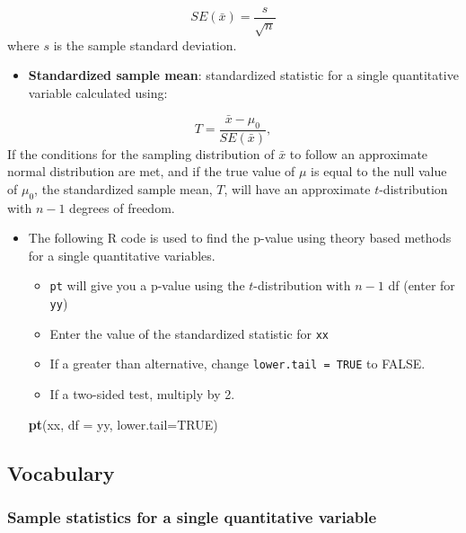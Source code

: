 \documentclass[
]{report}
\newenvironment{Shaded}{\begin{snugshade}}{\end{snugshade}}
\newcommand{\AttributeTok}[1]{\textcolor[rgb]{0.13,0.29,0.53}{#1}}
\newcommand{\ConstantTok}[1]{\textcolor[rgb]{0.56,0.35,0.01}{#1}}
\newcommand{\FunctionTok}[1]{\textcolor[rgb]{0.13,0.29,0.53}{\textbf{#1}}}
\newcommand{\NormalTok}[1]{#1}
\providecommand{\tightlist}{%
  \setlength{\itemsep}{0pt}\setlength{\parskip}{0pt}}
\begin{document}
\[SE(\bar{x})=\frac{s}{\sqrt{n}}\]
where \(s\) is the sample standard deviation.

\begin{itemize}
\tightlist
\item
  \textbf{Standardized sample mean}: standardized statistic for a single quantitative variable calculated using:
\end{itemize}

\[
T = \frac{\bar{x} - \mu_0}{SE(\bar{x})},
\]
If the conditions for the sampling distribution of \(\bar{x}\) to follow an approximate normal distribution are met, and if the true value of \(\mu\) is equal to the null value of \(\mu_0\), the standardized sample mean, \(T\), will have an approximate \(t\)-distribution with \(n-1\) degrees of freedom.

\begin{itemize}
\item
  The following R code is used to find the p-value using theory based methods for a single quantitative variables.

  \begin{itemize}
  \item
    \texttt{pt} will give you a p-value using the \(t\)-distribution with \(n-1\) df (enter for \texttt{yy})
  \item
    Enter the value of the standardized statistic for \texttt{xx}
  \item
    If a greater than alternative, change \texttt{lower.tail\ =\ TRUE} to FALSE.
  \item
    If a two-sided test, multiply by 2.
  \end{itemize}

\begin{Shaded}
\begin{Highlighting}[]
\FunctionTok{pt}\NormalTok{(xx, }\AttributeTok{df =}\NormalTok{ yy, }\AttributeTok{lower.tail=}\ConstantTok{TRUE}\NormalTok{)}
\end{Highlighting}
\end{Shaded}
\end{itemize}

\subsection{Vocabulary}\label{vocabulary}

\subsubsection*{Sample statistics for a single quantitative variable}\label{sample-statistics-for-a-single-quantitative-variable}
\end{document}
